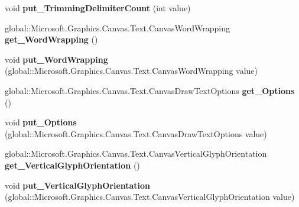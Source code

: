 \begin{DoxyCompactItemize}
void {\bfseries put\+\_\+\+Trimming\+Delimiter\+Count} (int value)
\item 
\mbox{\label{interface_microsoft_1_1_graphics_1_1_canvas_1_1_text_1_1_i_canvas_text_format_ad3a64c7bf2382793d928c1f6e15fc7f4}} 
global\+::\+Microsoft.\+Graphics.\+Canvas.\+Text.\+Canvas\+Word\+Wrapping {\bfseries get\+\_\+\+Word\+Wrapping} ()
\item 
\mbox{\label{interface_microsoft_1_1_graphics_1_1_canvas_1_1_text_1_1_i_canvas_text_format_a94d68cdaaf91c785c91ff377408932d4}} 
void {\bfseries put\+\_\+\+Word\+Wrapping} (global\+::\+Microsoft.\+Graphics.\+Canvas.\+Text.\+Canvas\+Word\+Wrapping value)
\item 
\mbox{\label{interface_microsoft_1_1_graphics_1_1_canvas_1_1_text_1_1_i_canvas_text_format_a208378a52440f0dccacbf5a5208e2e6d}} 
global\+::\+Microsoft.\+Graphics.\+Canvas.\+Text.\+Canvas\+Draw\+Text\+Options {\bfseries get\+\_\+\+Options} ()
\item 
\mbox{\label{interface_microsoft_1_1_graphics_1_1_canvas_1_1_text_1_1_i_canvas_text_format_a2f0c996edcd441c91461fbf033bf1203}} 
void {\bfseries put\+\_\+\+Options} (global\+::\+Microsoft.\+Graphics.\+Canvas.\+Text.\+Canvas\+Draw\+Text\+Options value)
\item 
\mbox{\label{interface_microsoft_1_1_graphics_1_1_canvas_1_1_text_1_1_i_canvas_text_format_abc2a32d3aacea2f49232cd218d252da8}} 
global\+::\+Microsoft.\+Graphics.\+Canvas.\+Text.\+Canvas\+Vertical\+Glyph\+Orientation {\bfseries get\+\_\+\+Vertical\+Glyph\+Orientation} ()
\item 
\mbox{\label{interface_microsoft_1_1_graphics_1_1_canvas_1_1_text_1_1_i_canvas_text_format_a4f0382db5faf99e239642e76ec8e2269}} 
void {\bfseries put\+\_\+\+Vertical\+Glyph\+Orientation} (global\+::\+Microsoft.\+Graphics.\+Canvas.\+Text.\+Canvas\+Vertical\+Glyph\+Orientation value)

\end{DoxyCompactItemize}
